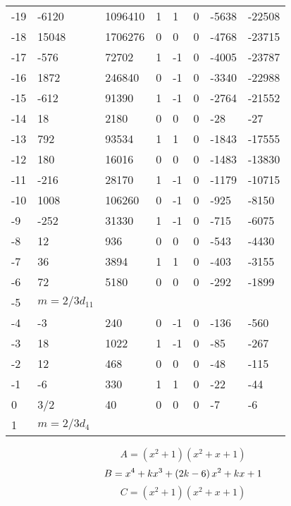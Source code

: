 \documentclass{amsart}
\begin{document}
\begin{longtable}{|l|l|l|lllll|}
-19&-6120&1096410&1&1&0&-5638&-22508\\
-18&15048&1706276&0&0&0&-4768&-23715\\
-17&-576&72702&1&-1&0&-4005&-23787\\
-16&1872&246840&0&-1&0&-3340&-22988\\
-15&-612&91390&1&-1&0&-2764&-21552\\
-14&18&2180&0&0&0&-28&-27\\
-13&792&93534&1&1&0&-1843&-17555\\
-12&180&16016&0&0&0&-1483&-13830\\
-11&-216&28170&1&-1&0&-1179&-10715\\
-10&1008&106260&0&-1&0&-925&-8150\\
-9&-252&31330&1&-1&0&-715&-6075\\
-8&12&936&0&0&0&-543&-4430\\
-7&36&3894&1&1&0&-403&-3155\\
-6&72&5180&0&0&0&-292&-1899\\
-5&$m=2/3d_{11}$&&\multicolumn{5}{c|}{}\\
-4&-3&240&0&-1&0&-136&-560\\
-3&18&1022&1&-1&0&-85&-267\\
-2&12&468&0&0&0&-48&-115\\
-1&-6&330&1&1&0&-22&-44\\
0&3/2&40&0&0&0&-7&-6\\
1&$m=2/3d_{4}$&&\multicolumn{5}{c|}{}\\
\hline
\end{longtable}
$$A=(x^2
 + 1)(x^2
 + x
 + 1)$$
$$B=x^4
 + k\*x^3
 + \left(2\*k
 - 6\right) \*x^2
 + k\*x
 + 1$$
$$C=(x^2
 + 1)(x^2
 + x
 + 1)$$
\end{document}
